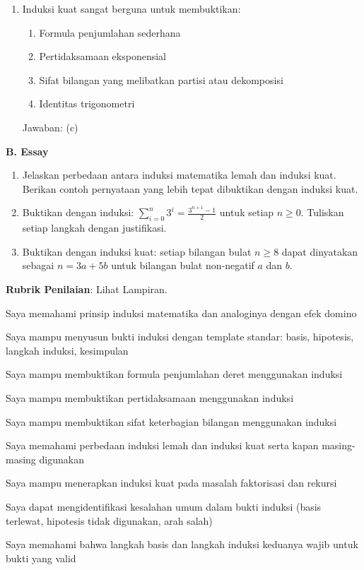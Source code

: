 \documentclass[../main]{subfiles}
\begin{document}
\begin{asesmen}
\begin{enumerate}
  \item Induksi kuat sangat berguna untuk membuktikan:
  \begin{enumerate}
    \item Formula penjumlahan sederhana
    \item Pertidaksamaan eksponensial
    \item Sifat bilangan yang melibatkan partisi atau dekomposisi
    \item Identitas trigonometri
  \end{enumerate}
  Jawaban: (c)
\end{enumerate}

\textbf{B. Essay}
\begin{enumerate}
  \item Jelaskan perbedaan antara induksi matematika lemah dan induksi kuat. Berikan contoh pernyataan yang lebih tepat dibuktikan dengan induksi kuat.
  \item Buktikan dengan induksi: $\displaystyle\sum_{i=0}^{n} 3^i = \frac{3^{n+1} - 1}{2}$ untuk setiap $n \geq 0$. Tuliskan setiap langkah dengan justifikasi.
  \item Buktikan dengan induksi kuat: setiap bilangan bulat $n \geq 8$ dapat dinyatakan sebagai $n = 3a + 5b$ untuk bilangan bulat non-negatif $a$ dan $b$.
\end{enumerate}

\textbf{Rubrik Penilaian}: Lihat Lampiran.
\end{asesmen}


\begin{checklist}
  \item Saya memahami prinsip induksi matematika dan analoginya dengan efek domino
  \item Saya mampu menyusun bukti induksi dengan template standar: basis, hipotesis, langkah induksi, kesimpulan
  \item Saya mampu membuktikan formula penjumlahan deret menggunakan induksi
  \item Saya mampu membuktikan pertidaksamaan menggunakan induksi
  \item Saya mampu membuktikan sifat keterbagian bilangan menggunakan induksi
  \item Saya memahami perbedaan induksi lemah dan induksi kuat serta kapan masing-masing digunakan
  \item Saya mampu menerapkan induksi kuat pada masalah faktorisasi dan rekursi
  \item Saya dapat mengidentifikasi kesalahan umum dalam bukti induksi (basis terlewat, hipotesis tidak digunakan, arah salah)
  \item Saya memahami bahwa langkah basis dan langkah induksi keduanya wajib untuk bukti yang valid
\end{checklist}
\end{document}
